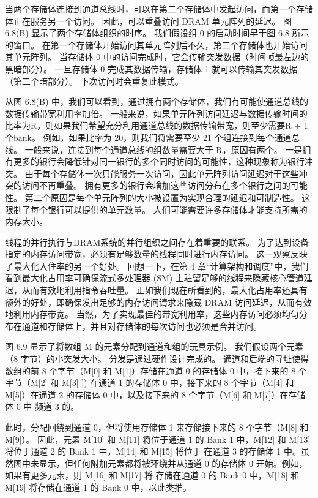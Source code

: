 当两个存储体连接到通道总线时，可以在第二个存储体中发起访问，而第一个存储体正在服务另一个访问。 因此，可以重叠访问 DRAM 单元阵列的延迟。 图 6.8(B) 显示了两个存储体组织的时序。 我们假设组 0 的启动时间早于图 6.8 所示的窗口。 在第一个存储体开始访问其单元阵列后不久，第二个存储体也开始访问其单元阵列。 当存储体 0 中的访问完成时，它会传输突发数据（时间帧最左边的黑暗部分）。 一旦存储体 0 完成其数据传输，存储体 1 就可以传输其突发数据（第二个暗部分）。 下次访问时会重复此模式。

从图 6.8(B) 中，我们可以看到，通过拥有两个存储体，我们有可能使通道总线的数据传输带宽利用率加倍。 一般来说，如果单元阵列访问延迟与数据传输时间的比率为R，则如果我们希望充分利用通道总线的数据传输带宽，则至少需要R + 1个bank。 例如，如果比率为 20，则我们将需要至少 21 个组连接到每个通道总线。 一般来说，连接到每个通道总线的组数量需要大于 R，原因有两个。 一是拥有更多的银行会降低针对同一银行的多个同时访问的可能性，这种现象称为银行冲突。 由于每个存储体一次只能服务一次访问，因此单元阵列访问延迟对于这些冲突的访问不再重叠。 拥有更多的银行会增加这些访问分布在多个银行之间的可能性。 第二个原因是每个单元阵列的大小被设置为实现合理的延迟和可制造性。 这限制了每个银行可以提供的单元数量。 人们可能需要许多存储体才能支持所需的内存大小。

线程的并行执行与DRAM系统的并行组织之间存在着重要的联系。 为了达到设备指定的内存访问带宽，必须有足够数量的线程同时进行内存访问。 这一观察反映了最大化入住率的另一个好处。 回想一下，在第 4 章“计算架构和调度”中，我们看到最大化占用率可确保流式多处理器 (SM) 上驻留足够的线程来隐藏核心管道延迟，从而有效地利用指令吞吐量。 正如我们现在所看到的，最大化占用率还具有额外的好处，即确保发出足够的内存访问请求来隐藏 DRAM 访问延迟，从而有效地利用内存带宽。 当然，为了实现最佳的带宽利用率，这些内存访问必须均匀分布在通道和存储体上，并且对存储体的每次访问也必须是合并访问。

图 6.9 显示了将数组 M 的元素分配到通道和组的玩具示例。 我们假设两个元素（8 字节）的小突发大小。 分发是通过硬件设计完成的。 通道和后端的寻址使得数组的前 8 个字节（M[0] 和 M[1]）存储在通道 0 的存储体 0 中，接下来的 8 个字节（M[2] 和 M[3] ]) 在通道 1 的存储体 0 中，接下来的 8 个字节（M[4] 和 M[5]）在通道 2 的存储体 0 中，以及接下来的 8 个字节（M[6] 和 M[7]）在存储体 0 中 频道 3 的。

此时，分配回绕到通道 0，但将使用存储体 1 来存储接下来的 8 个字节（M[8] 和 M[9]）。 因此，元素 M[10] 和 M[11] 将位于通道 1 的 Bank 1 中，M[12] 和 M[13] 将位于通道 2 的 Bank 1 中，M[14] 和 M[15] 将位于 在通道 3 的存储体 1 中。虽然图中未显示，但任何附加元素都将被环绕并从通道 0 的存储体 0 开始。例如，如果有更多元素，则 M[16] 和 M[17] 将 存储在通道 0 的 Bank 0 中，M[18] 和 M[19] 将存储在通道 1 的 Bank 0 中，以此类推。


